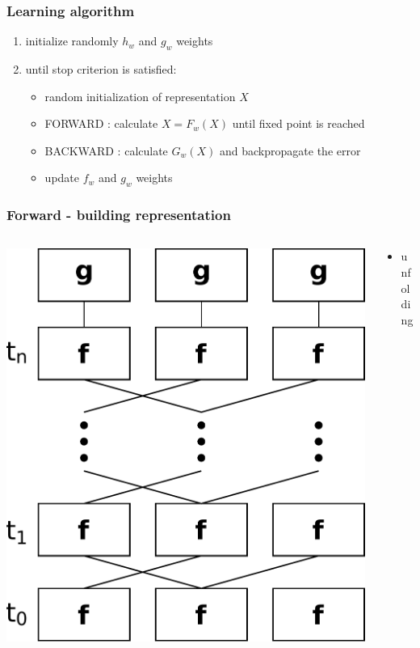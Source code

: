 \documentclass{beamer}
\begin{document}
\begin{frame}
\frametitle{Learning algorithm}
\begin{enumerate}
	\item initialize randomly $h_w$ and $g_w$ weights
	\item until stop criterion is satisfied:
	\begin{itemize}
		\item random initialization of representation $X$
		\item FORWARD : calculate $X = F_w(X)$ until fixed point is reached
		\item BACKWARD : calculate $G_w(X)$ and backpropagate the error
		\item update $f_w$ and $g_w$ weights
	\end{itemize}
\end{enumerate}
\end{frame}

\begin{frame}
\frametitle{Forward - building representation}
\begin{columns}
	\begin{column}{0.66\textwidth}
		\includegraphics[scale=0.4]{img/forward}
	\end{column}
	\begin{column}{0.34\textwidth}
		\begin{itemize}
			\item unfolding
		\end{itemize}
	\end{column}
\end{columns}
\end{frame}
\end{document}
